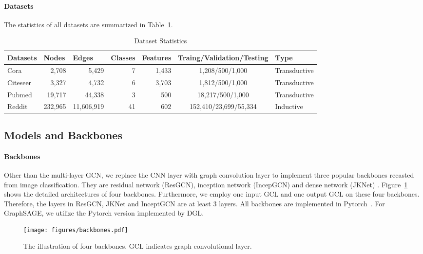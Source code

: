\documentclass{article}
\begin{document}
\paragraph{Datasets} The statistics of all datasets are summarized in Table~\ref{table:data}.
\begin{table}[htbp]
  \centering
  \caption{Dataset Statistics}
  \vspace{-2ex}
  \small
\begin{tabular}{lrrrrcl}
\hline
Datasets & \multicolumn{1}{l}{Nodes} & \multicolumn{1}{l}{Edges} & \multicolumn{1}{l}{Classes} & \multicolumn{1}{l}{Features} & \multicolumn{1}{l}{Traing/Validation/Testing} & Type \\
\hline
Cora  & 2,708 & 5,429 & 7     & 1,433 & 1,208/500/1,000 & Transductive \\
Citeseer & 3,327 & 4,732 & 6     & 3,703 & 1,812/500/1,000 & Transductive \\
Pubmed & 19,717 & 44,338 & 3     & 500   & 18,217/500/1,000 & Transductive \\
Reddit & 232,965 & 11,606,919 & 41    & 602   & 152,410/23,699/55,334 & Inductive \\
\hline
\end{tabular}\label{table:data}\end{table}


\subsection{Models and Backbones}
\paragraph{Backbones}
Other than the multi-layer GCN, we replace the CNN layer with graph convolution layer to implement three popular backbones recasted from image classification. They are residual network (ResGCN)\citep{he2016deep,li2019can}, inception network (IncepGCN)\citep{szegedy2016} and dense network (JKNet) \citep{Huang2017,xu2018representation}. Figure~\ref{fig:backbones} shows the detailed architectures of  four backbones. Furthermore, we employ one input GCL and one output GCL on these four backbones. Therefore, the layers in ResGCN, JKNet and InceptGCN are at least 3 layers. All backbones are implemented in Pytorch~\citep{paszke2017automatic}. For GraphSAGE, we utilize the Pytorch version implemented by DGL\citep{wang2019dgl}.

\begin{figure}[htbp]
    \centering
    \texttt{[image: figures/backbones.pdf]}
    \caption{The illustration of four backbones. GCL indicates graph convolutional layer.}
    \label{fig:backbones}
\end{figure}
\end{document}

